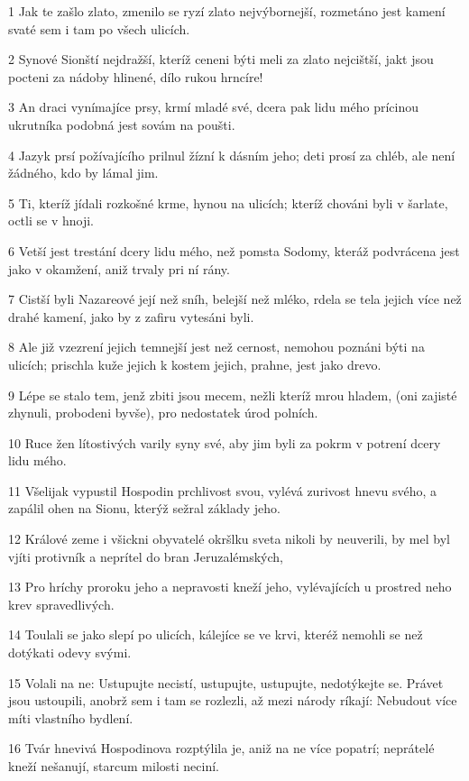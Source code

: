 \par 1 Jak te zašlo zlato, zmenilo se ryzí zlato nejvýbornejší, rozmetáno jest kamení svaté sem i tam po všech ulicích.
\par 2 Synové Sionští nejdražší, kteríž ceneni býti meli za zlato nejcištší, jakt jsou pocteni za nádoby hlinené, dílo rukou hrncíre!
\par 3 An draci vynímajíce prsy, krmí mladé své, dcera pak lidu mého prícinou ukrutníka podobná jest sovám na poušti.
\par 4 Jazyk prsí požívajícího prilnul žízní k dásním jeho; deti prosí za chléb, ale není žádného, kdo by lámal jim.
\par 5 Ti, kteríž jídali rozkošné krme, hynou na ulicích; kteríž chováni byli v šarlate, octli se v hnoji.
\par 6 Vetší jest trestání dcery lidu mého, než pomsta Sodomy, kteráž podvrácena jest jako v okamžení, aniž trvaly pri ní rány.
\par 7 Cistší byli Nazareové její než sníh, belejší než mléko, rdela se tela jejich více než drahé kamení, jako by z zafiru vytesáni byli.
\par 8 Ale již vzezrení jejich temnejší jest než cernost, nemohou poznáni býti na ulicích; prischla kuže jejich k kostem jejich, prahne, jest jako drevo.
\par 9 Lépe se stalo tem, jenž zbiti jsou mecem, nežli kteríž mrou hladem, (oni zajisté zhynuli, probodeni byvše), pro nedostatek úrod polních.
\par 10 Ruce žen lítostivých varily syny své, aby jim byli za pokrm v potrení dcery lidu mého.
\par 11 Všelijak vypustil Hospodin prchlivost svou, vylévá zurivost hnevu svého, a zapálil ohen na Sionu, kterýž sežral základy jeho.
\par 12 Králové zeme i všickni obyvatelé okršlku sveta nikoli by neuverili, by mel byl vjíti protivník a neprítel do bran Jeruzalémských,
\par 13 Pro hríchy proroku jeho a nepravosti kneží jeho, vylévajících u prostred neho krev spravedlivých.
\par 14 Toulali se jako slepí po ulicích, kálejíce se ve krvi, kteréž nemohli se než dotýkati odevy svými.
\par 15 Volali na ne: Ustupujte necistí, ustupujte, ustupujte, nedotýkejte se. Právet jsou ustoupili, anobrž sem i tam se rozlezli, až mezi národy ríkají: Nebudout více míti vlastního bydlení.
\par 16 Tvár hnevivá Hospodinova rozptýlila je, aniž na ne více popatrí; neprátelé kneží nešanují, starcum milosti neciní.
